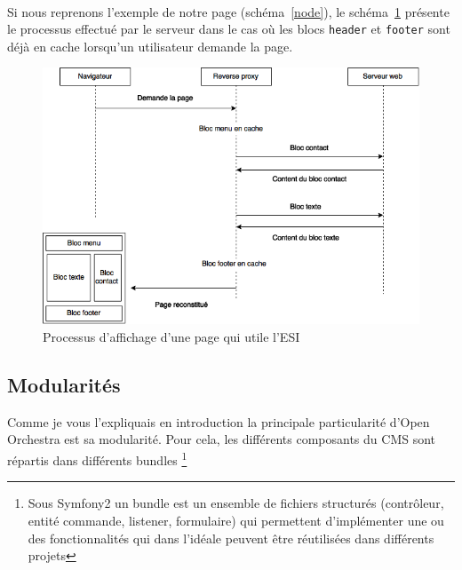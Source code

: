    \paragraph{}
   Si nous reprenons l'exemple de notre page (schéma~\ref{node}), le schéma~\ref{esi} présente le processus effectué par le serveur dans le cas où les blocs \verb?header? et \verb?footer? sont déjà en cache lorsqu'un utilisateur demande la page.
   		\begin{figure}[H]
        \begin{center}
          \includegraphics[scale=0.75]{images/esi}
        \end{center}
        \caption{Processus d'affichage d'une page qui utile l'ESI}
        \label{esi}
      \end{figure}
   
   \subsection{Modularités}
   Comme je vous l'expliquais en introduction la principale particularité d'Open Orchestra est sa modularité. Pour cela, les différents composants du CMS sont répartis dans différents bundles \footnote{Sous Symfony2 un bundle est un ensemble de fichiers structurés (contrôleur, entité commande, listener, formulaire) qui permettent d'implémenter une ou des fonctionnalités qui dans l'idéale peuvent être réutilisées dans différents projets}
